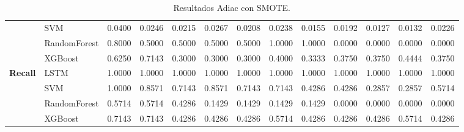 \begin{table}[h]
\begin{adjustbox}{max width=15cm}
\begin{tabular}{|c|l|r|r|r|r|r|r|r|r|r|r|r|}
			& SVM &  0.0400 &  0.0246 &  0.0215 &  0.0267 &  0.0208 &  0.0238 &  0.0155 &  0.0192 &  0.0127 &  0.0132 &  0.0226 \\
			& RandomForest &  0.8000 &  0.5000 &  0.5000 &  0.5000 &  0.5000 &  1.0000 &  1.0000 &  0.0000 &  0.0000 &  0.0000 &  0.0000 \\
			& XGBoost &  0.6250 &  0.7143 &  0.3000 &  0.3000 &  0.3000 &  0.4000 &  0.3333 &  0.3750 &  0.3750 &  0.4444 &  0.3750 \\
			\hline
			\textbf{Recall} & LSTM &  1.0000 &  1.0000 &  1.0000 &  1.0000 &  1.0000 &  1.0000 &  1.0000 &  1.0000 &  1.0000 &  1.0000 &  1.0000 \\
			& SVM &  1.0000 &  0.8571 &  0.7143 &  0.8571 &  0.7143 &  0.7143 &  0.4286 &  0.4286 &  0.2857 &  0.2857 &  0.5714 \\
			& RandomForest &  0.5714 &  0.5714 &  0.4286 &  0.1429 &  0.1429 &  0.1429 &  0.1429 &  0.0000 &  0.0000 &  0.0000 &  0.0000 \\
			& XGBoost &  0.7143 &  0.7143 &  0.4286 &  0.4286 &  0.4286 &  0.5714 &  0.4286 &  0.4286 &  0.4286 &  0.5714 &  0.4286 \\
			\hline
		\end{tabular}
	\end{adjustbox}
	\caption{Resultados Adiac con SMOTE.}
	\label{tab:Adiac_SMOTE}
\end{table}
